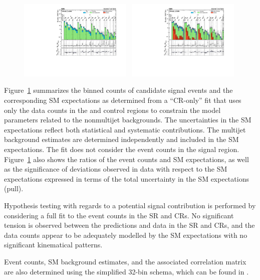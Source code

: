 \begin{figure}[!p]
  \includegraphics[width=0.48\textwidth, trim=10 0 60 10, clip=true]{Figures/5jet_cr-only.pdf}~
  \includegraphics[width=0.48\textwidth, trim=10 0 60 10, clip=true]{Figures/6jet_cr-only.pdf}\\
  \label{fig:result}
\end{figure}

Figure~\ref{fig:result} summarizes the binned counts of candidate
signal events and the corresponding SM expectations as determined from
a ``CR-only'' fit that uses only the data counts in the \mj and \mmj
control regions to constrain the model parameters related to the
nonmultijet backgrounds. The uncertainties in the SM expectations
reflect both statistical and systematic contributions. The multijet
background estimates are determined independently and included in the
SM expectations. The fit does not consider the event counts in the
signal region. Figure~\ref{fig:result} also shows the ratios of the
event counts and SM expectations, as well as the significance of
deviations observed in data with respect to the SM expectations
expressed in terms of the total uncertainty in the SM expectations
(pull).

Hypothesis testing with regards to a potential signal contribution is
performed by considering a full fit to the event counts in the SR and
CRs. No significant tension is observed between the predictions and
data in the SR and CRs, and the data counts appear to be adequately
modelled by the SM expectations with no significant kinematical
patterns.

Event counts, SM background estimates, and the associated correlation
matrix are also determined using the simplified 32-bin schema, which
can be found in \suppMaterial.

